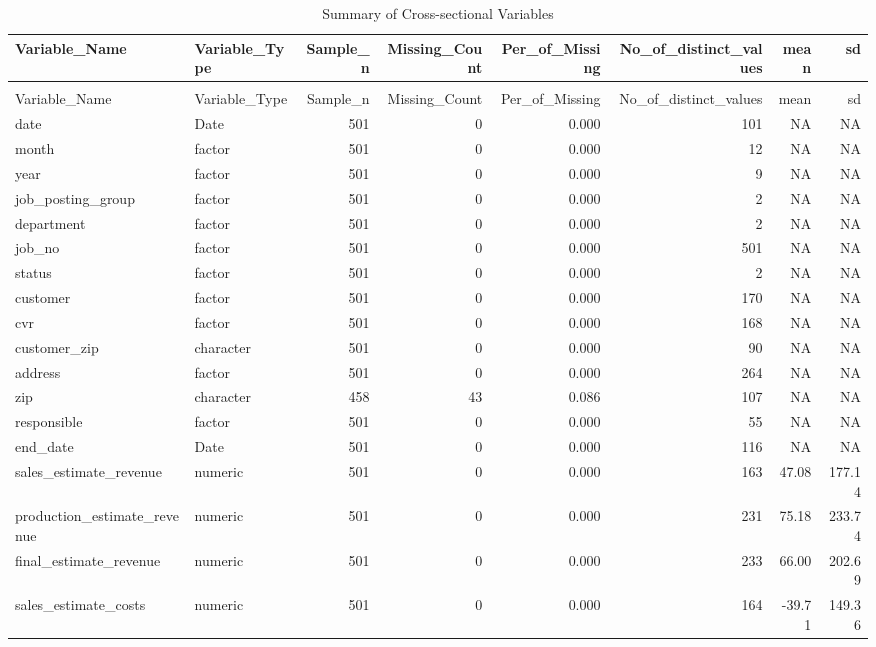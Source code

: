 \begingroup\fontsize{9}{11}\selectfont

\begin{landscape}
\begin{longtable}[t]{llrrrrrr}
\caption{Summary of Cross-sectional Variables}\\
\toprule
Variable\_Name & Variable\_Type & Sample\_n & Missing\_Count & Per\_of\_Missing & No\_of\_distinct\_values & mean & sd\\
\midrule
\endfirsthead
\caption[]{Summary of Cross-sectional Variables }\\
\toprule
Variable\_Name & Variable\_Type & Sample\_n & Missing\_Count & Per\_of\_Missing & No\_of\_distinct\_values & mean & sd\\
\midrule
\endhead

\endfoot
\bottomrule
\endlastfoot
date & Date & 501 & 0 & 0.000 & 101 & NA & NA\\
month & factor & 501 & 0 & 0.000 & 12 & NA & NA\\
year & factor & 501 & 0 & 0.000 & 9 & NA & NA\\
job\_posting\_group & factor & 501 & 0 & 0.000 & 2 & NA & NA\\
department & factor & 501 & 0 & 0.000 & 2 & NA & NA\\
job\_no & factor & 501 & 0 & 0.000 & 501 & NA & NA\\
status & factor & 501 & 0 & 0.000 & 2 & NA & NA\\
customer & factor & 501 & 0 & 0.000 & 170 & NA & NA\\
cvr & factor & 501 & 0 & 0.000 & 168 & NA & NA\\
customer\_zip & character & 501 & 0 & 0.000 & 90 & NA & NA\\
address & factor & 501 & 0 & 0.000 & 264 & NA & NA\\
zip & character & 458 & 43 & 0.086 & 107 & NA & NA\\
responsible & factor & 501 & 0 & 0.000 & 55 & NA & NA\\
end\_date & Date & 501 & 0 & 0.000 & 116 & NA & NA\\
sales\_estimate\_revenue & numeric & 501 & 0 & 0.000 & 163 & 47.08 & 177.14\\
production\_estimate\_revenue & numeric & 501 & 0 & 0.000 & 231 & 75.18 & 233.74\\
final\_estimate\_revenue & numeric & 501 & 0 & 0.000 & 233 & 66.00 & 202.69\\
sales\_estimate\_costs & numeric & 501 & 0 & 0.000 & 164 & -39.71 & 149.36\\

\end{longtable}
\end{landscape}
